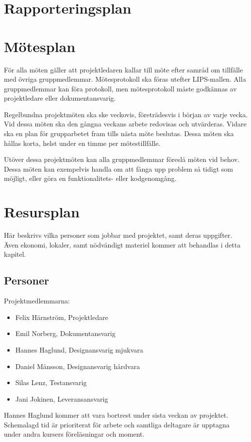 \documentclass[a4paper,11pt]{article}
\begin{document}
\section{Rapporteringsplan}

\section{Mötesplan}
För alla möten gäller att projektledaren kallar till möte efter samråd om tillfälle med övriga gruppmedlemmar. Mötesprotokoll ska föras utefter LIPS-mallen. Alla gruppmedlemmar kan föra protokoll, men mötesprotokoll måste godkännas av projektledare eller dokumentansvarig.

Regelbundna projektmöten ska ske veckovis, företrädesvis i början av varje vecka. Vid dessa möten ska den gångna veckans arbete redovisas och utvärderas. Vidare ska en plan för grupparbetet fram tills nästa möte beslutas. Dessa möten ska hållas korta, helst under en timme per mötestillfälle. 

Utöver dessa projektmöten kan alla gruppmedlemmar föreslå möten vid behov. Dessa möten kan exempelvis handla om att fånga upp problem så tidigt som möjligt, eller göra en funktionalitets- eller kodgenomgång.

\section{Resursplan}
Här beskrivs vilka personer som jobbar med projektet, samt deras uppgifter. Även ekonomi, lokaler, samt nödvändigt materiel kommer att behandlas i detta kapitel.

\subsection{Personer}
Projektmedlemmarna:
\begin{itemize}
	\item Felix Härnström, Projektledare
	\item Emil Norberg, Dokumentansvarig
	\item Hannes Haglund, Designansvarig mjukvara
	\item Daniel Månsson, Designansvarig hårdvara
	\item Silas Lenz, Testansvarig
	\item Jani Jokinen, Leveransansvarig
\end{itemize}
Hannes Haglund kommer att vara bortrest under sista veckan av projektet.
Schemalagd tid är prioriterat för arbete och samtliga deltagare är upptagna under andra kursers föreläsningar och moment.
\end{document}
